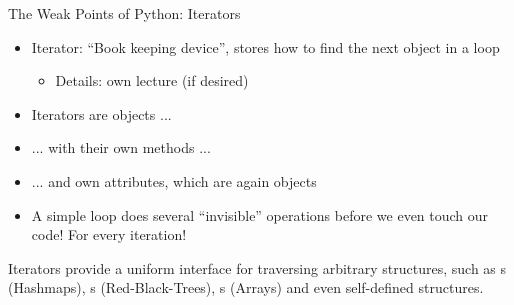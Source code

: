 \begin{frame}[fragile]{The Weak Points of Python: Iterators}
%
\begin{itemize}
\item Iterator: \enquote{Book keeping device}, stores how to find the next object in a loop
	\begin{itemize}
	\item Details: own lecture (if desired)
	\end{itemize}
\item Iterators are objects ...
\item ... with their own methods ...
\item ... and own attributes, which are again objects
\item[\Thus] A simple  loop does several \enquote{invisible} operations before we even touch our code! For every iteration!
\end{itemize}
%
\begin{hintbox}
Iterators provide a uniform interface for traversing arbitrary structures, such as s (Hashmaps), s (Red-Black-Trees), s (Arrays) and even self-defined structures.
\end{hintbox}
%
\end{frame}


